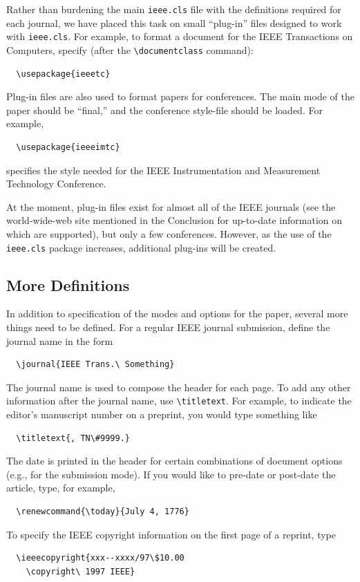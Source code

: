 \documentclass[%
	final,
	notitlepage,
	narroweqnarray,
	inline,
	twoside,
	]{ieee}
\begin{document}
Rather than burdening the main \texttt{ieee.cls} file with the
definitions required for each journal, we have placed this task on
small ``plug-in'' files designed to work with \texttt{ieee.cls}. For
example, to format a document for the IEEE Transactions on Computers,
specify (after the \verb|\documentclass| command):
\begin{verbatim}
  \usepackage{ieeetc}
\end{verbatim}
Plug-in files are also used to format papers for conferences. The 
main mode of the paper should be ``final,'' and the 
conference style-file should be loaded. For example,
\begin{verbatim}
  \usepackage{ieeeimtc}
\end{verbatim}
specifies the style needed for the IEEE Instrumentation and
Measurement Technology Conference.

At the moment, plug-in files exist for almost all of the IEEE journals
(see the world-wide-web site mentioned in the Conclusion for
up-to-date information on which are supported), but only a few
conferences.  However, as the use of the \texttt{ieee.cls} package
increases, additional plug-ins will be created.

\subsection{More Definitions}

In addition to specification of the modes and options for the paper,
several more things need to be defined. For a regular IEEE journal
submission, define the journal name in the form
\begin{verbatim}
  \journal{IEEE Trans.\ Something}
\end{verbatim}
The journal name is used to compose the header for each page.  To add
any other information after the journal name, use \verb|\titletext|.
For example, to indicate the editor's manuscript number on a preprint,
you would type something like
\begin{verbatim}
  \titletext{, TN\#9999.}
\end{verbatim}

The date is printed in the header for certain combinations of document
options (e.g., for the submission mode). If you would like to pre-date
or post-date the article, type, for example,
\begin{verbatim}
  \renewcommand{\today}{July 4, 1776}
\end{verbatim}
To specify the IEEE copyright information on the first page of a
reprint, type
\begin{verbatim}
  \ieeecopyright{xxx--xxxx/97\$10.00 
    \copyright\ 1997 IEEE}
\end{verbatim}
\end{document}
